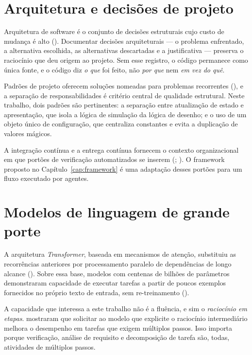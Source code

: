 \section{Arquitetura e decisões de projeto}
\label{sec:arquitetura}

Arquitetura de software é o conjunto de decisões estruturais cujo custo de
mudança é alto (). Documentar decisões arquiteturais
--- o problema enfrentado, a alternativa escolhida, as alternativas descartadas e
a justificativa --- preserva o raciocínio que deu origem ao projeto. Sem esse
registro, o código permanece como única fonte, e o código diz \emph{o que} foi
feito, não \emph{por que} nem \emph{em vez do quê}.

Padrões de projeto oferecem soluções nomeadas para problemas recorrentes
(), e a separação de responsabilidades é critério central
de qualidade estrutural. Neste trabalho, dois padrões são pertinentes: a
separação entre atualização de estado e apresentação, que isola a lógica de
simulação da lógica de desenho; e o uso de um objeto único de configuração, que
centraliza constantes e evita a duplicação de valores mágicos.

A integração contínua e a entrega contínua fornecem o contexto organizacional em
que portões de verificação automatizados se inserem
(; ). O framework proposto no
Capítulo~\ref{cap:framework} é uma adaptação desses portões para um fluxo
executado por agentes.

\section{Modelos de linguagem de grande porte}
\label{sec:llm}

A arquitetura \textit{Transformer}, baseada em mecanismos de atenção, substituiu
as recorrências anteriores por processamento paralelo de dependências de longo
alcance (). Sobre essa base, modelos com centenas de
bilhões de parâmetros demonstraram capacidade de executar tarefas a partir de
poucos exemplos fornecidos no próprio texto de entrada, sem re-treinamento
().

A capacidade que interessa a este trabalho não é a fluência, e sim o
\emph{raciocínio em etapas}.  mostraram que solicitar ao
modelo que explicite o raciocínio intermediário melhora o desempenho em tarefas
que exigem múltiplos passos. Isso importa porque verificação, análise de
requisito e decomposição de tarefa são, todas, atividades de múltiplos passos.

